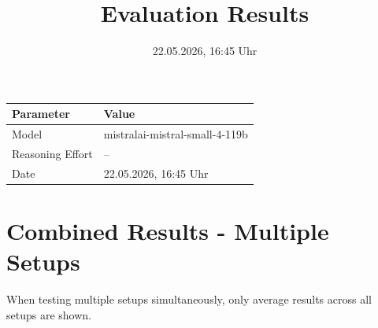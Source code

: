 \documentclass[a4paper,11pt]{article}
\title{Evaluation Results}
\date{22.05.2026, 16:45 Uhr}
\begin{document}
\maketitle

\begin{table}[H]
\centering
\begin{tabular}{l l}
\toprule
\textbf{Parameter} & \textbf{Value} \\
\midrule
Model & mistralai-mistral-small-4-119b \\
Reasoning Effort & -- \\
Date & 22.05.2026, 16:45 Uhr \\
\bottomrule
\end{tabular}
\end{table}

\tableofcontents
\clearpage

\section{Combined Results - Multiple Setups}

When testing multiple setups simultaneously, only average results across all setups are shown.
\end{document}
